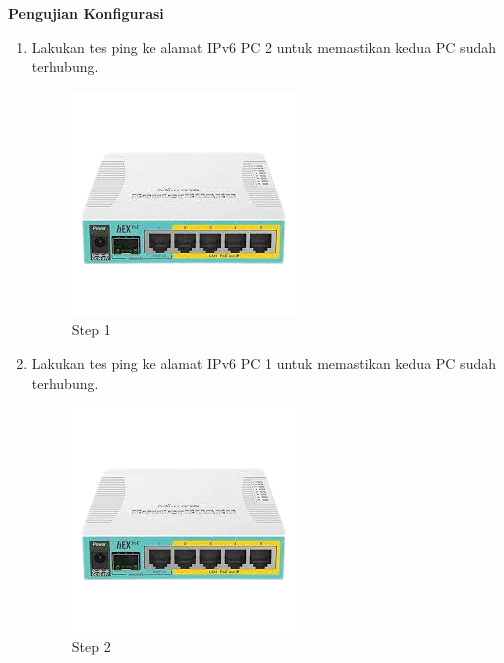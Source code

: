 \begin{enumerate}
\end{enumerate}

\begin{center} 
	\textbf{Pengujian Konfigurasi}
\end{center}

\begin{enumerate}
	\item Lakukan tes ping ke alamat IPv6 PC 2 untuk memastikan kedua PC sudah terhubung.
	
	\begin{figure}[H]
		\centering
		\includegraphics[width=0.7\linewidth]{P1/img/contoh.png}
		\caption{Step 1}
		\label{fig:gambar1}
	\end{figure}

	\item Lakukan tes ping ke alamat IPv6 PC 1 untuk memastikan kedua PC sudah terhubung.
	
	\begin{figure}[H]
		\centering
		\includegraphics[width=0.7\linewidth]{P1/img/contoh.png}
		\caption{Step 2}
		\label{fig:gambar1}
	\end{figure}

\end{enumerate}

